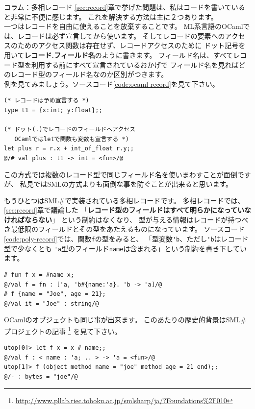 \documentclass[11pt,a4paper]{article}
\begin{document}
\begin{itembox}[l]{コラム：多相レコード}
  \ref{sec:record}章で挙げた問題は、私はコードを書いていると非常に不便に感じます。
  これを解決する方法は主に２つあります。\\
  一つはレコードを自由に使えることを放棄することです。
  ML系言語のOCaml\cite{ocaml}では、レコードは必ず宣言してから使います。
  そしてレコードの要素へのアクセスのためのアクセス関数は存在せず、レコードアクセスのために
  ドット記号を用いて\textbf{レコード.フィールド名}のように書きます。
  フィールド名は、すべてレコード型を利用する前にすべて宣言されているおかげで
  フィールド名を見ればどのレコード型のフィールド名なのか区別がつきます。\\
  例を見てみましょう。ソースコード\ref{code:ocaml-record}を見て下さい。

\begin{lstlisting}[caption=OCamlにおけるレコード,label=code:ocaml-record]
(* レコードは予め宣言する *)
type t1 = {x:int; y:float};;

(* ドット(.)でレコードのフィールドへアクセス
   OCamlではletで関数も変数も宣言する *)
let plus r = r.x + int_of_float r.y;;
@/# val plus : t1 -> int = <fun>/@
\end{lstlisting}

  この方式では複数のレコード型で同じフィールド名を使いまわすことが面倒ですが、
  私見ではSMLの方式よりも面倒な事を防ぐことが出来ると思います。

  もうひとつはSML\#\cite{smlsharp}で実装されている多相レコードです。
  多相レコードでは、\ref{sec:record}章で議論した
 「\textbf{レコード型のフィールドはすべて明らかになっていなければならない}」
  という制約はなくなり、
  型が与える情報はレコードが持つべき最低限のフィールドとその型をあたえるものになっています。
  ソースコード\ref{code:poly-record}では、関数\lstinline{f}の型をみると、
  「型変数\lstinline{'b}、ただし\lstinline{'b}はレコード型で少なくとも
  \lstinline{'a}型のフィールド\lstinline{name}は含まれる」という制約を書き下しています。

\begin{lstlisting}[caption=SML\#の多相レコード,label=code:poly-record]
# fun f x = #name x;
@/val f = fn : ['a, 'b#{name:'a}. 'b -> 'a]/@
# f {name = "Joe", age = 21};
@/val it = "Joe" : string/@
\end{lstlisting}

  OCamlのオブジェクトも同じ事が出来ます。
  このあたりの歴史的背景はSML\#プロジェクトの記事  \footnote{\url{http://www.pllab.riec.tohoku.ac.jp/smlsharp/ja/?Foundations\%2F010}}
  を見て下さい。

\begin{lstlisting}[caption=OCamlのオブジェクト,label=code:ocaml-obj]
utop[0]> let f x = x # name;;
@/val f : < name : 'a; .. > -> 'a = <fun>/@
utop[1]> f (object method name = "joe" method age = 21 end);;
@/- : bytes = "joe"/@
\end{lstlisting}

\end{itembox}
\end{document}
